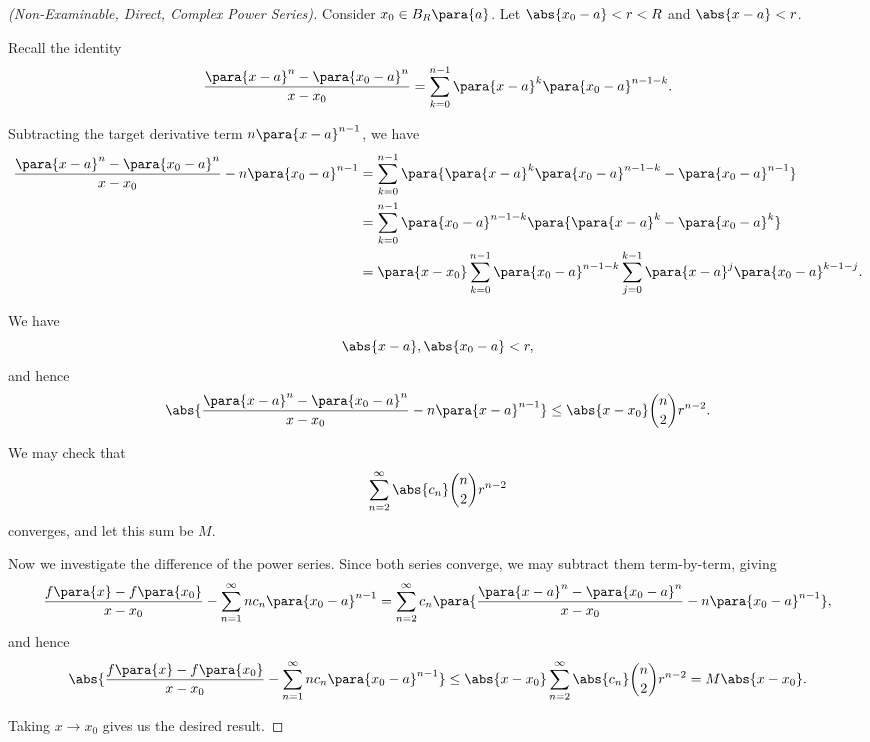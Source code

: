 \begin{proof}[(Non-Examinable, Direct, Complex Power Series)]
    Consider \(x_0 \in B_R\para{a}\). Let \(\abs{x_0 - a} < r < R\) and \(\abs{x - a} < r\).

    Recall the identity
    \[
        \frac{\para{x - a}^n - \para{x_0 - a}^n}{x - x_0} = \sum_{k = 0}^{n - 1} \para{x - a}^k \para{x_0 - a}^{n - 1 - k}.
    \]

    Subtracting the target derivative term \(n \para{x - a}^{n - 1}\), we have
    \begin{align*}
        \frac{\para{x - a}^n - \para{x_0 - a}^n}{x - x_0} - n \para{x_0 - a}^{n - 1} &= \sum_{k = 0}^{n - 1} \para{\para{x - a}^k \para{x_0 - a}^{n - 1 - k} - \para{x_0 - a}^{n - 1}} \\
        &= \sum_{k = 0}^{n - 1} \para{x_0 - a}^{n - 1 - k} \para{\para{x - a}^k - \para{x_0 - a}^k} \\
        &= \para{x - x_0} \sum_{k = 0}^{n - 1} \para{x_0 - a}^{n - 1 - k} \sum_{j = 0}^{k - 1} \para{x - a}^{j} \para{x_0 - a}^{k - 1 - j}.
    \end{align*}

    We have
    \[
        \abs{x - a}, \abs{x_0 - a} < r,
    \]
    and hence
    \[
        \abs{\frac{\para{x - a}^n - \para{x_0 - a}^n}{x - x_0} - n \para{x - a}^{n - 1}} \leq \abs{x - x_0} \binom{n}{2} r^{n - 2}.
    \]

    We may check that
    \[
        \sum_{n = 2}^{\infty} \abs{c_n} \binom{n}{2} r^{n - 2}
    \]
    converges, and let this sum be \(M\).
    
    Now we investigate the difference of the power series. Since both series converge, we may subtract them term-by-term, giving
    \[
        \frac{f\para{x} - f\para{x_0}}{x - x_0} - \sum_{n = 1}^{\infty} n c_n \para{x_0 - a}^{n - 1} = \sum_{n = 2}^{\infty} c_n \para{\frac{\para{x - a}^n - \para{x_0 - a}^n}{x - x_0} - n \para{x_0 - a}^{n - 1}},
    \]
    and hence
    \[
        \abs{\frac{f\para{x} - f\para{x_0}}{x - x_0} - \sum_{n = 1}^{\infty} n c_n \para{x_0 - a}^{n - 1}} \leq \abs{x - x_0} \sum_{n = 2}^{\infty} \abs{c_n} \binom{n}{2} r^{n - 2} = M \abs{x - x_0}.
    \]

    Taking \(x \to x_0\) gives us the desired result.
\end{proof}


